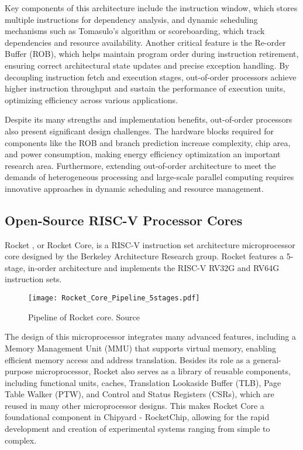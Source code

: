 Key components of this architecture include the instruction window, which stores multiple instructions for dependency analysis, and dynamic scheduling mechanisms such as Tomasulo's algorithm or scoreboarding, which track dependencies and resource availability. Another critical feature is the Re-order Buffer (ROB), which helps maintain program order during instruction retirement, ensuring correct architectural state updates and precise exception handling. By decoupling instruction fetch and execution stages, out-of-order processors achieve higher instruction throughput and sustain the performance of execution units, optimizing efficiency across various applications.

Despite its many strengths and implementation benefits, out-of-order processors also present significant design challenges. The hardware blocks required for components like the ROB and branch prediction increase complexity, chip area, and power consumption, making energy efficiency optimization an important research area. Furthermore, extending out-of-order architecture to meet the demands of heterogeneous processing and large-scale parallel computing requires innovative approaches in dynamic scheduling and resource management.

\subsection{Open-Source RISC-V Processor Cores}

Rocket \cite{asanovic2016rocket}, or Rocket Core, is a RISC-V instruction set architecture microprocessor core designed by the Berkeley Architecture Research group. Rocket features a 5-stage, in-order architecture and implements the RISC-V RV32G and RV64G instruction sets.

\begin{figure}[h!]
    \centering
    \texttt{[image: Rocket\_Core\_Pipeline\_5stages.pdf]}
    \caption{Pipeline of Rocket core. Source \cite{asanovic2016rocket}}
    \label{fig:rocket_pipeline}
\end{figure}

The design of this microprocessor integrates many advanced features, including a Memory Management Unit (MMU) that supports virtual memory, enabling efficient memory access and address translation. Besides its role as a general-purpose microprocessor, Rocket also serves as a library of reusable components, including functional units, caches, Translation Lookaside Buffer (TLB), Page Table Walker (PTW), and Control and Status Registers (CSRs), which are reused in many other microprocessor designs. This makes Rocket Core a foundational component in Chipyard - RocketChip, allowing for the rapid development and creation of experimental systems ranging from simple to complex.

